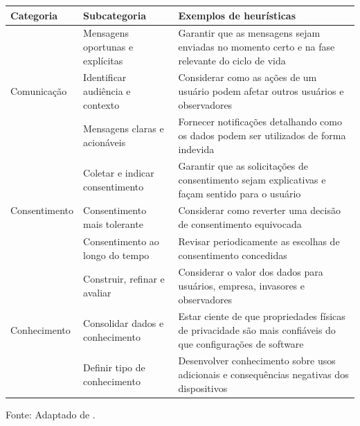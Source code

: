 \documentclass[
	12pt,				%
	oneside,			%
	a4paper,			%
	english,			%
	brazil				%
	]{abntex2ppgsi}
\begin{document}
\begin{quadro}[h]
    \centering
    \caption{Categorias e subcategorias do framework de 
    heurísticas de }
    \label{tab:chalhoub-heuristicas}
    \renewcommand{\arraystretch}{1.4}
    \small
    \begin{tabular}{p{2.5cm}p{3cm}p{6.5cm}}
        \hline
        \textbf{Categoria} & 
        \textbf{Subcategoria} & 
        \textbf{Exemplos de heurísticas} \\
        \hline
        \multirow{3}{*}{Comunicação} 
        & Mensagens oportunas e explícitas 
        & Garantir que as mensagens sejam enviadas no 
          momento certo e na fase relevante do ciclo 
          de vida \\
        & Identificar audiência e contexto 
        & Considerar como as ações de um usuário podem 
          afetar outros usuários e observadores \\
        & Mensagens claras e acionáveis 
        & Fornecer notificações detalhando como os dados 
          podem ser utilizados de forma indevida \\
        \hline
        \multirow{3}{*}{Consentimento} 
        & Coletar e indicar consentimento 
        & Garantir que as solicitações de consentimento 
          sejam explicativas e façam sentido para o 
          usuário \\
        & Consentimento mais tolerante 
        & Considerar como reverter uma decisão de 
          consentimento equivocada \\
        & Consentimento ao longo do tempo 
        & Revisar periodicamente as escolhas de 
          consentimento concedidas \\
        \hline
        \multirow{3}{*}{Conhecimento} 
        & Construir, refinar e avaliar 
        & Considerar o valor dos dados para usuários, 
          empresa, invasores e observadores \\
        & Consolidar dados e conhecimento 
        & Estar ciente de que propriedades físicas de 
          privacidade são mais confiáveis do que 
          configurações de software \\
        & Definir tipo de conhecimento 
        & Desenvolver conhecimento sobre usos adicionais 
          e consequências negativas dos dispositivos \\
        \hline
    \end{tabular}

    \vspace{0.2cm}
    {\small Fonte: Adaptado de .}
\end{quadro}
\end{document}
